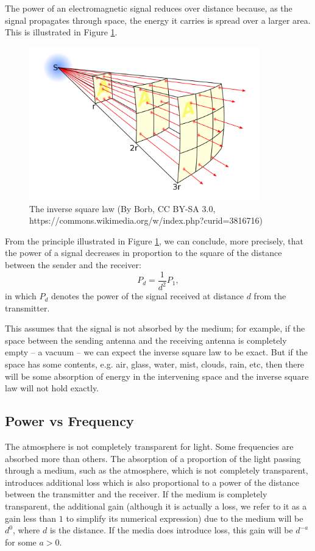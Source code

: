 The power of an electromagnetic signal reduces over distance because,
as the signal propagates through space, the energy it carries is spread
over a larger area. This is illustrated in Figure \ref{inversesquarelaw}.
\begin{figure}
	\centering
	\includegraphics[width=10cm]{Inverse_square_law_svg}
	\caption{The inverse square law (By Borb, CC BY-SA 3.0, https://commons.wikimedia.org/w/index.php?curid=3816716)}
	\label{inversesquarelaw}
\end{figure}

From the principle illustrated in Figure \ref{inversesquarelaw}, we can conclude,
more precisely, that the power of a signal decreases in proportion to the square of the distance
between the sender and the receiver:
\begin{equation}
	P_d = \frac{1}{d^2} P_1,
\end{equation}
in which $P_d$ denotes the power of the signal received at distance $d$ from the transmitter.

This assumes that the signal is not absorbed by the medium; for example, if the space between
the sending antenna and the receiving antenna is completely empty -- a vacuum -- we can expect
the inverse square law to be exact. But if the space has some contents, e.g. air, glass, water, 
mist, clouds, rain, etc, then there will be some absorption of energy in the intervening space
and the inverse square law will not hold exactly.

\subsection{Power vs Frequency }

The atmosphere is not completely transparent for light. Some frequencies are absorbed
more than others. The absorption of a proportion of the light passing through
a medium, such as the atmosphere, which is not completely transparent, introduces
additional loss which is also proportional to a power of the distance between the
transmitter and the receiver. If the medium is completely transparent, the additional
gain (although it is actually a loss, we refer to it as a gain less than $1$
to simplify its numerical expression) due to the medium will be $d^0$, where
$d$ is the distance. If the media does introduce loss, this gain will be $d^{-a}$
for some $a>0$.

